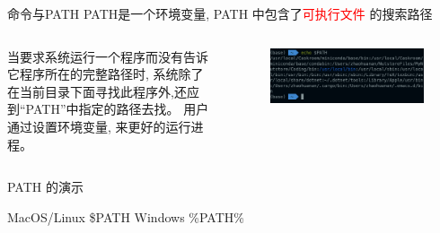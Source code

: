 \begin{frame}{命令与PATH}
    PATH是一个环境变量, PATH 中包含了\textcolor{red}{可执行文件} 的搜索路径

    \begin{columns}
            \tiny{
            当要求系统运行一个程序而没有告诉它程序所在的完整路径时,
            系统除了在当前目录下面寻找此程序外,还应到``PATH''中指定的路径去找。
            用户通过设置环境变量, 来更好的运行进程。
            }
        \begin{figure}
            \begin{flushright}
                \includegraphics[width=1\linewidth]{Images/path.jpg}
            \end{flushright}
        \end{figure}
    \end{columns}
\end{frame}


\begin{frame}[standout]{PATH 的演示}
    \begin{myoutline}
        \1 MacOS/Linux
            \2 \$PATH
        \1 Windows
            \2 \%PATH\%
    \end{myoutline}
\end{frame}




